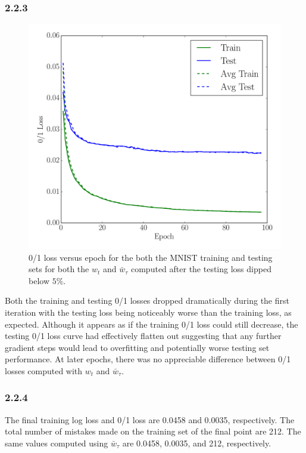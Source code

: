 \documentclass[12pt]{amsart}
\begin{document}
\subsubsection*{2.2.3}
\begin{figure}[H]
	\includegraphics[width=\columnwidth]{logistic_01_loss_masked.pdf}
    \caption{0/1 loss versus epoch for the both the MNIST training and testing sets for both the $w_t$ and $\bar{w}_{\tau}$ computed after the testing loss dipped below $5\%$.}
    \label{fig:logistic_01_loss_masked}
\end{figure}
Both the training and testing 0/1 losses dropped dramatically during the first iteration with the testing loss being noticeably worse than the training loss, as expected.  Although it appears as if the training 0/1 loss could still decrease, the testing 0/1 loss curve had effectively flatten out suggesting that any further gradient steps would lead to overfitting and potentially worse testing set performance.  At later epochs, there was no appreciable difference between 0/1 losses computed with $w_t$ and $\bar{w}_{\tau}$.

\subsubsection*{2.2.4}
The final training log loss and 0/1 loss are 0.0458 and 0.0035, respectively.  The total number of mistakes made on the training set of the final point are 212.  The same values computed using $\bar{w}_{\tau}$ are 0.0458, 0.0035, and 212, respectively.
\end{document}
